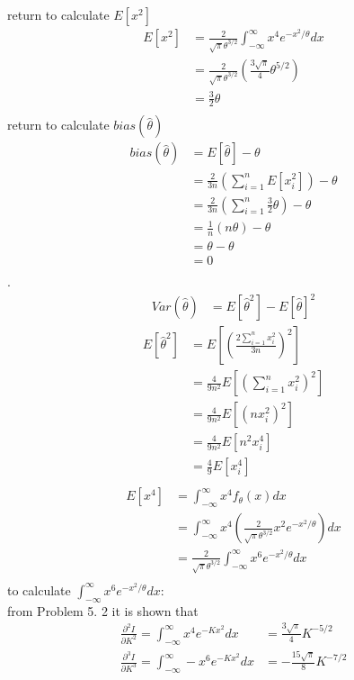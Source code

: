 \documentclass[12pt,border=4pt,multi]{article} %
\begin{document}
return to calculate $E[x^2]$
\begin{align*}
E[x^2] &= \frac{2}{\sqrt{\pi}\theta^{3 / 2}} \int_{-\infty}^{\infty} x^4 e^{-x^2 / \theta} dx\\
&= \frac{2}{\sqrt{\pi}\theta^{3 / 2}} \left(\frac{3\sqrt{\pi}}{4}\theta^{5 / 2}\right)\\
&= \frac{3}{2}\theta\\
\end{align*}
return to calculate $bias(\hat{\theta})$
\begin{align*}
bias(\hat{\theta}) &= E[\hat{\theta}] - \theta\\
&= \frac{2}{3n}\left(\sum_{i = 1}^n E[x_i^2]\right) - \theta\\
&= \frac{2}{3n}\left(\sum_{i = 1}^n \frac{3}{2}\theta\right) - \theta\\
&= \frac{1}{n}(n\theta) - \theta\\
&= \theta - \theta\\
&= \boxed{0}\\
\end{align*}
\newpage
{}.
\begin{align*}
Var(\hat{\theta}) &= E[\hat{\theta}^2] - E[\hat{\theta}]^2
\end{align*}
\begin{align*}
E[\hat{\theta}^2] &= E\left[\left(\frac{2\sum_{i = 1}^n x_i^2}{3n}\right)^2\right]\\
&= \frac{4}{9n^2}E\left[\left(\sum_{i = 1}^n x_i^2\right)^2\right]\\
&= \frac{4}{9n^2}E\left[(n x_i^2)^2\right]\\
&= \frac{4}{9n^2}E\left[n^2 x_i^4\right]\\
&= \frac{4}{9}E\left[x_i^4\right]\\
\end{align*}
\begin{align*}
E[x^4] &= \int_{-\infty}^{\infty} x^4 f_\theta(x) dx\\
&= \int_{-\infty}^{\infty} x^4 \left(\frac{2}{\sqrt{\pi}\theta^{3 / 2}} x^2 e^{-x^2 / \theta}\right) dx\\
&= \frac{2}{\sqrt{\pi}\theta^{3 / 2}} \int_{-\infty}^{\infty} x^6 e^{-x^2 / \theta} dx\\
\end{align*}
to calculate $\int_{-\infty}^{\infty} x^6 e^{-x^2 / \theta} dx$:\\
from Problem 5. 2 it is shown that 
\begin{align*}
\frac{\partial^2 I}{\partial K^2} = \int_{-\infty}^{\infty} x^4 e^{-Kx^2} dx &= \frac{3\sqrt{\pi}}{4}K^{-5 / 2}\\
\frac{\partial^3 I}{\partial K^3} = \int_{-\infty}^{\infty} -x^6 e^{-Kx^2} dx &= -\frac{15\sqrt{\pi}}{8}K^{-7 / 2}\\
\end{align*}
\end{document}
